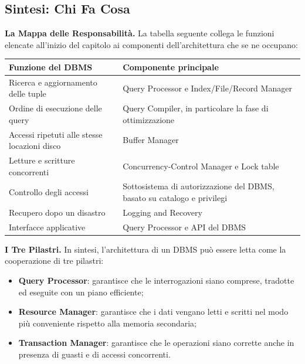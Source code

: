 \documentclass[12pt]{extarticle}
\begin{document}
\subsection{Sintesi: Chi Fa Cosa}

\noindent \textbf{La Mappa delle Responsabilità.} La tabella seguente collega le funzioni elencate all'inizio del capitolo ai componenti dell'architettura che se ne occupano:

\begin{center}
\small
\begin{tabular}{p{7.1cm}p{8.2cm}}
    \toprule
    \textbf{Funzione del DBMS} & \textbf{Componente principale} \\
    \midrule
    Ricerca e aggiornamento delle tuple & Query Processor e Index/File/Record Manager \\
    \addlinespace
    Ordine di esecuzione delle query & Query Compiler, in particolare la fase di ottimizzazione \\
    \addlinespace
    Accessi ripetuti alle stesse locazioni disco & Buffer Manager \\
    \addlinespace
    Letture e scritture concorrenti & Concurrency-Control Manager e Lock table \\
    \addlinespace
    Controllo degli accessi & Sottosistema di autorizzazione del DBMS, basato su catalogo e privilegi \\
    \addlinespace
    Recupero dopo un disastro & Logging and Recovery \\
    \addlinespace
    Interfacce applicative & Query Processor e API del DBMS \\
    \bottomrule
\end{tabular}
\end{center}

\medskip
\noindent \textbf{I Tre Pilastri.} In sintesi, l'architettura di un DBMS può essere letta come la cooperazione di tre pilastri:
\begin{itemize}
    \item \textbf{Query Processor}: garantisce che le interrogazioni siano comprese, tradotte ed eseguite con un piano efficiente;
    \item \textbf{Resource Manager}: garantisce che i dati vengano letti e scritti nel modo più conveniente rispetto alla memoria secondaria;
    \item \textbf{Transaction Manager}: garantisce che le operazioni siano corrette anche in presenza di guasti e di accessi concorrenti.
\end{itemize}
\end{document}
